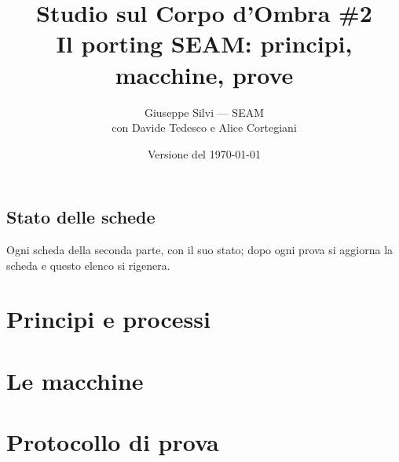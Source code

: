 \documentclass[11pt,a4paper,openany]{report}
\title{Studio sul Corpo d'Ombra \#2\\\large Il porting SEAM: principi, macchine, prove}
\author{Giuseppe Silvi --- SEAM\\\small con Davide Tedesco e Alice Cortegiani}
\date{Versione del \today}
\begin{document}
\maketitle
\begin{abstract}

\end{abstract}
\tableofcontents

\chapter*{Stato delle schede}\label{cap:stati}
Ogni scheda della seconda parte, con il suo stato; dopo ogni prova si aggiorna la scheda e questo elenco si rigenera.
\medskip

\listastati

\part{Principi e processi}


\part{Le macchine}






\part{Protocollo di prova}


\appendix

\end{document}
